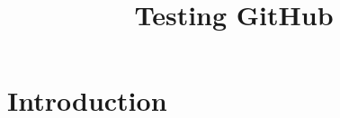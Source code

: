 \documentclass{article}
\title{Testing GitHub}
\author{}
\date{}
\begin{document}
\maketitle

\section{Introduction}
\lipsum[1-5]
\end{document}
